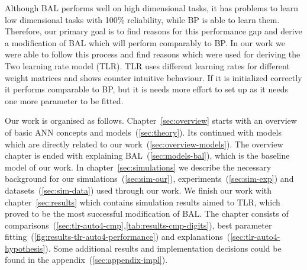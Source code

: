 

Although BAL performs well on high dimensional tasks, it has problems to learn low dimensional tasks with 100\% reliability, while BP is able to learn them. Therefore, our primary goal is to find reasons for this performance gap and derive a modification of BAL which will perform comparably to BP. In our work we were able to follow this process and find reasons which were used for deriving the Two learning rate model (TLR). TLR uses different learning rates for different weight matrices and shows counter intuitive behaviour. If it is initialized correctly it performs comparable to BP, but it is needs more effort to set up as it needs one more parameter to be fitted. 


Our work is organised as follows. Chapter~\ref{sec:overview} starts with an overview of basic ANN concepts and models~(\ref{sec:theory}). Its continued with models which are directly related to our work~(\ref{sec:overview-models}). The overview chapter is ended with explaining BAL~(\ref{sec:models-bal}), which is the baseline model of our work. In chapter~\ref{sec:simulations} we describe the necessary background for our simulations~(\ref{sec:sim-our}), experiments~(\ref{sec:sim-exp}) and datasets~(\ref{sec:sim-data}) used through our work. We finish our work with chapter~\ref{sec:results} which contains simulation results aimed to TLR, which proved to be the most successful modification of BAL. The chapter consists of comparisons~(\ref{sec:tlr-auto4-cmp},\ref{tab:results-cmp-digits}), best parameter fitting~(\ref{fig:results-tlr-auto4-performance}) and explanations~(\ref{sec:tlr-auto4-hypothesis}). Some additional results and implementation decisions could be found in the appendix~(\ref{sec:appendix-impl}).  





